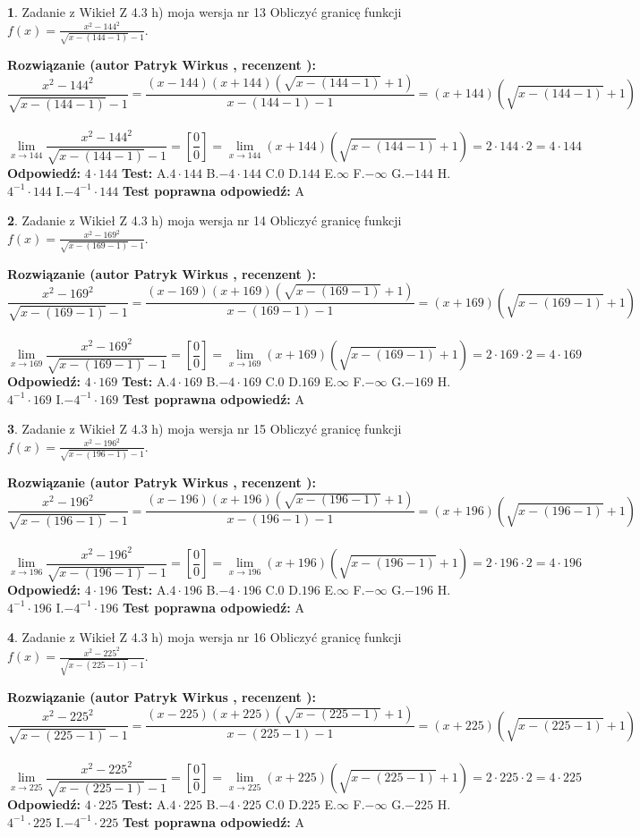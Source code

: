 \documentclass[12pt, a4paper]{article}
\theoremstyle{definition} %
\newtheorem{zad}{}
\newcommand{\zadStart}[1]{\begin{zad}#1\newline}
\newcommand{\zadStop}{\end{zad}}
\newcommand{\rozwStart}[2]{\noindent \textbf{Rozwiązanie (autor #1 , recenzent #2): }\newline}
\newcommand{\rozwStop}{\newline}
\newcommand{\odpStart}{\noindent \textbf{Odpowiedź:}\newline}
\newcommand{\odpStop}{\newline}
\newcommand{\testStart}{\noindent \textbf{Test:}\newline}
\newcommand{\testStop}{\newline}
\newcommand{\kluczStart}{\noindent \textbf{Test poprawna odpowiedź:}\newline}
\newcommand{\kluczStop}{\newline}
\begin{document}
\zadStart{Zadanie z Wikieł Z 4.3 h) moja wersja nr 13}
Obliczyć granicę funkcji $f(x)=\frac{x^{2} - 144^{2}}{\sqrt{x-(144-1)}-1}$.
\zadStop
\rozwStart{Patryk Wirkus}{}
$$\frac{x^{2} - 144^{2}}{\sqrt{x-(144-1)}-1}=\frac{(x-144)(x+144)(\sqrt{x-(144-1)}+1)}{x-(144-1)-1}=(x+144)(\sqrt{x-(144-1)}+1)$$
\\
$$\lim\limits_{x\to 144}\frac{x^{2} - 144^{2}}{\sqrt{x-(144-1)}-1}=[\frac{0}{0}]=
\lim\limits_{x\to 144}(x+144)(\sqrt{x-(144-1)}+1) = 2\cdot144 \cdot 2 = 4 \cdot 144$$
\rozwStop
\odpStart
$4\cdot144$
\odpStop
\testStart
A.$4\cdot144$
B.$-4\cdot144$
C.$0$
D.$144$
E.$\infty$
F.$-\infty$
G.$-144$
H.$4^{-1}\cdot144$
I.$-4^{-1}\cdot144$
\testStop
\kluczStart
A
\kluczStop



\zadStart{Zadanie z Wikieł Z 4.3 h) moja wersja nr 14}
Obliczyć granicę funkcji $f(x)=\frac{x^{2} - 169^{2}}{\sqrt{x-(169-1)}-1}$.
\zadStop
\rozwStart{Patryk Wirkus}{}
$$\frac{x^{2} - 169^{2}}{\sqrt{x-(169-1)}-1}=\frac{(x-169)(x+169)(\sqrt{x-(169-1)}+1)}{x-(169-1)-1}=(x+169)(\sqrt{x-(169-1)}+1)$$
\\
$$\lim\limits_{x\to 169}\frac{x^{2} - 169^{2}}{\sqrt{x-(169-1)}-1}=[\frac{0}{0}]=
\lim\limits_{x\to 169}(x+169)(\sqrt{x-(169-1)}+1) = 2\cdot169 \cdot 2 = 4 \cdot 169$$
\rozwStop
\odpStart
$4\cdot169$
\odpStop
\testStart
A.$4\cdot169$
B.$-4\cdot169$
C.$0$
D.$169$
E.$\infty$
F.$-\infty$
G.$-169$
H.$4^{-1}\cdot169$
I.$-4^{-1}\cdot169$
\testStop
\kluczStart
A
\kluczStop



\zadStart{Zadanie z Wikieł Z 4.3 h) moja wersja nr 15}
Obliczyć granicę funkcji $f(x)=\frac{x^{2} - 196^{2}}{\sqrt{x-(196-1)}-1}$.
\zadStop
\rozwStart{Patryk Wirkus}{}
$$\frac{x^{2} - 196^{2}}{\sqrt{x-(196-1)}-1}=\frac{(x-196)(x+196)(\sqrt{x-(196-1)}+1)}{x-(196-1)-1}=(x+196)(\sqrt{x-(196-1)}+1)$$
\\
$$\lim\limits_{x\to 196}\frac{x^{2} - 196^{2}}{\sqrt{x-(196-1)}-1}=[\frac{0}{0}]=
\lim\limits_{x\to 196}(x+196)(\sqrt{x-(196-1)}+1) = 2\cdot196 \cdot 2 = 4 \cdot 196$$
\rozwStop
\odpStart
$4\cdot196$
\odpStop
\testStart
A.$4\cdot196$
B.$-4\cdot196$
C.$0$
D.$196$
E.$\infty$
F.$-\infty$
G.$-196$
H.$4^{-1}\cdot196$
I.$-4^{-1}\cdot196$
\testStop
\kluczStart
A
\kluczStop



\zadStart{Zadanie z Wikieł Z 4.3 h) moja wersja nr 16}
Obliczyć granicę funkcji $f(x)=\frac{x^{2} - 225^{2}}{\sqrt{x-(225-1)}-1}$.
\zadStop
\rozwStart{Patryk Wirkus}{}
$$\frac{x^{2} - 225^{2}}{\sqrt{x-(225-1)}-1}=\frac{(x-225)(x+225)(\sqrt{x-(225-1)}+1)}{x-(225-1)-1}=(x+225)(\sqrt{x-(225-1)}+1)$$
\\
$$\lim\limits_{x\to 225}\frac{x^{2} - 225^{2}}{\sqrt{x-(225-1)}-1}=[\frac{0}{0}]=
\lim\limits_{x\to 225}(x+225)(\sqrt{x-(225-1)}+1) = 2\cdot225 \cdot 2 = 4 \cdot 225$$
\rozwStop
\odpStart
$4\cdot225$
\odpStop
\testStart
A.$4\cdot225$
B.$-4\cdot225$
C.$0$
D.$225$
E.$\infty$
F.$-\infty$
G.$-225$
H.$4^{-1}\cdot225$
I.$-4^{-1}\cdot225$
\testStop
\kluczStart
A
\kluczStop
\end{document}
